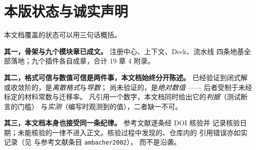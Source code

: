 \section{本版状态与诚实声明}
\label{sec:intro-status}

本文档覆盖的状态可以用三句话概括。

\textbf{其一，骨架与九个模块章已成文。} 注册中心、上下文、Deck、流水线
四条地基全部落地；九个插件各自成章，合计 19 章 4 附录。

\textbf{其二，格式可信与数值可信是两件事，本文档始终分开陈述。}
已经验证到闭式解或收敛阶的，是\emph{离散格式}与\emph{导数}；
尚未验证的，是\emph{绝对数值} —— 后者受制于未经标定的材料常数与迁移率。
凡引用一个数字，本文档同时给出它的\emph{判据}（测试断言的门槛）
与\emph{实测}（编写时观测到的值），二者缺一不可。

\textbf{其三，本文档本身也接受同一条纪律。} 参考文献逐条经 DOI 核验并
记录核验日期；未能核验的一律不进入正文。核验过程中发现的、仓库内的
引用错误亦如实记录（见  与参考文献条目 \texttt{ambacher2002}），
而不是沿袭。

\cleardoublepage
